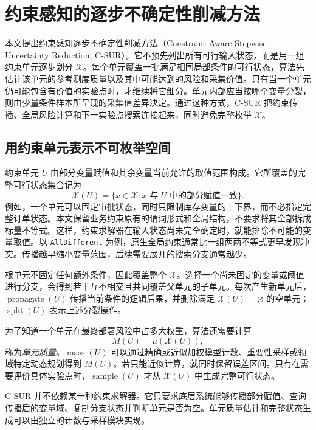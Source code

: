 \documentclass[UTF8,11pt,a4paper,fontset=none]{ctexart}
\newcommand{\X}{\mathcal X}
\newcommand{\1}{\mathbf 1}
\begin{document}
\section{约束感知的逐步不确定性削减方法}

本文提出约束感知逐步不确定性削减方法（Constraint-Aware Stepwise Uncertainty Reduction, C-SUR）。它不预先列出所有可行输入状态，而是用一组约束单元逐步划分 $\X$。每个单元覆盖一批满足相同局部条件的可行状态，算法先估计该单元的参考测度质量以及其中可能达到的风险和采集价值。只有当一个单元仍可能包含有价值的实验点时，才继续将它细分。单元内部应当按哪个变量分裂，则由少量条件样本所呈现的采集值差异决定。通过这种方式，C-SUR 把约束传播、全局风险计算和下一实验点搜索连接起来，同时避免完整枚举 $\X$。

\subsection{用约束单元表示不可枚举空间}

约束单元 $U$ 由部分变量赋值和其余变量当前允许的取值范围构成。它所覆盖的完整可行状态集合记为
\begin{equation}
  \X(U)=\{x\in\X:x\text{ 与 }U\text{ 中的部分赋值一致}\}.
\end{equation}
例如，一个单元可以固定审批状态，同时只限制库存变量的上下界，而不必指定完整订单状态。本文保留业务约束原有的谓词形式和全局结构，不要求将其全部拆成标量不等式。这样，约束求解器在输入状态尚未完全确定时，就能排除不可能的变量取值。以 \texttt{AllDifferent} 为例，原生全局约束通常比一组两两不等式更早发现冲突。传播越早缩小变量范围，后续需要展开的搜索分支通常越少。

根单元不固定任何额外条件，因此覆盖整个 $\X$。选择一个尚未固定的变量或阈值进行分支，会得到若干互不相交且共同覆盖父单元的子单元。每次产生新单元后，$\operatorname{propagate}(U)$ 传播当前条件的逻辑后果，并删除满足 $\X(U)=\varnothing$ 的空单元；$\operatorname{split}(U)$ 表示上述分裂操作。

为了知道一个单元在最终部署风险中占多大权重，算法还需要计算
\begin{equation}
  M(U)=\mu(\X(U)),
\end{equation}
称为\emph{单元质量}。$\operatorname{mass}(U)$ 可以通过精确或近似加权模型计数、重要性采样或领域特定动态规划得到 $M(U)$。若只能近似计算，就同时保留误差区间。只有在需要评价具体实验点时，$\operatorname{sample}(U)$ 才从 $\X(U)$ 中生成完整可行状态。

C-SUR 并不依赖某一种约束求解器。它只要求底层系统能够传播部分赋值、查询传播后的变量域、复制分支状态并判断单元是否为空。单元质量估计和完整状态生成可以由独立的计数与采样模块实现。
\end{document}
